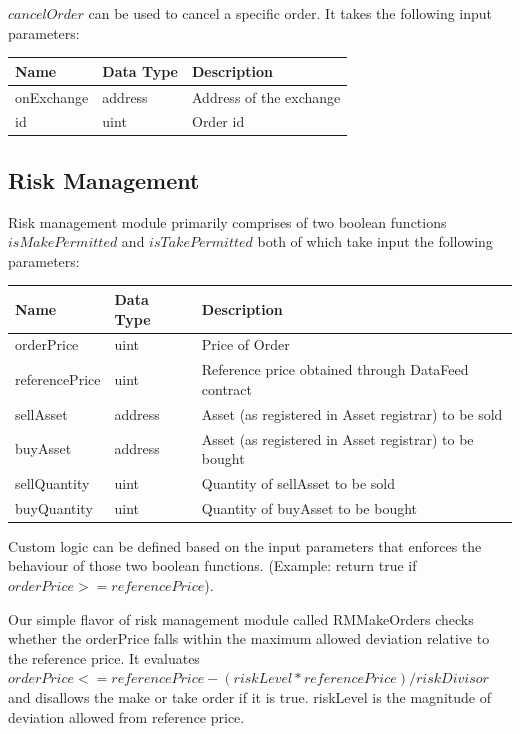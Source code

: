 \documentclass[conference]{IEEEtran}
\begin{document}
$cancelOrder$ can be used to cancel a specific order. It takes the following input parameters:
\begin{center}
	\footnotesize
	\begin{tabular}{ | p{2.7cm} | p{0.8cm} | p{4cm} | }
		\hline
		Name & Data Type & Description \\ \hline
		onExchange & address & Address of the exchange \\ \hline
		id & uint & Order id \\ \hline
	\end{tabular}
\end{center}

\subsection{Risk Management}

Risk management module primarily comprises of two boolean functions $isMakePermitted$ and $isTakePermitted$ both of which take input the following parameters:

\begin{center}
	\footnotesize
	\begin{tabular}{ | p{2.7cm} | p{0.8cm} | p{4cm} | }
		\hline
		Name & Data Type & Description \\ \hline
		orderPrice & uint & Price of Order \\ \hline
		referencePrice & uint &  Reference price obtained through DataFeed contract \\ \hline
		sellAsset & address & Asset (as registered in Asset registrar) to be sold \\ \hline
		buyAsset & address & Asset (as registered in Asset registrar) to be bought \\ \hline
		sellQuantity & uint & Quantity of sellAsset to be sold \\ \hline
		buyQuantity & uint & Quantity of buyAsset to be bought \\ \hline
	\end{tabular}
\end{center}

Custom logic can be defined based on the input parameters that enforces the behaviour of those two boolean functions. (Example: return true if $orderPrice >= referencePrice$). 

Our simple flavor of risk management module called RMMakeOrders checks whether the orderPrice falls within the maximum allowed deviation relative to the reference price. It evaluates $orderPrice <= referencePrice - (riskLevel  * referencePrice) / riskDivisor$ and disallows the make or take order if it is true. riskLevel is the magnitude of deviation allowed from reference price. 
\end{document}
